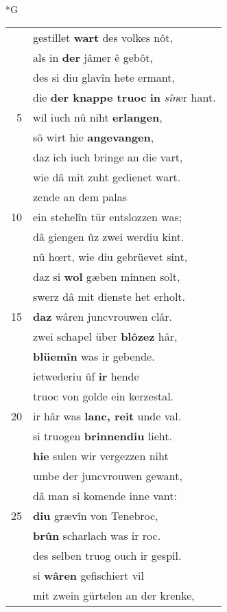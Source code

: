 \documentclass[8pt,a4paper,notitlepage]{article}
\begin{document}
\newpage
\begin{table}[ht]
\begin{minipage}[t]{0.5\linewidth}
\small
\begin{center}*G
\end{center}
\begin{tabular}{rl}
 & gestillet \textbf{wart} des volkes nôt,\\ 
 & als in \textbf{der} jâmer ê gebôt,\\ 
 & des si diu glavîn hete ermant,\\ 
 & die \textbf{der knappe truoc} \textbf{in} \textit{sîn}er hant.\\ 
5 & wil iuch nû niht \textbf{erlangen},\\ 
 & sô wirt hie \textbf{angevangen},\\ 
 & daz ich iuch bringe an die vart,\\ 
 & wie dâ mit zuht gedienet wart.\\ 
 & zende an dem palas\\ 
10 & ein stehelîn tür entslozzen was;\\ 
 & dâ giengen ûz zwei werdiu kint.\\ 
 & nû hœrt, wie diu gebrüevet sint,\\ 
 & daz si \textbf{wol} gæben minnen solt,\\ 
 & swerz dâ mit dienste het erholt.\\ 
15 & \textbf{daz} wâren juncvrouwen clâr.\\ 
 & zwei schapel über \textbf{blôzez} hâr,\\ 
 & \textbf{blüemîn} was ir gebende.\\ 
 & ietwederiu ûf \textbf{ir} hende\\ 
 & truoc von golde ein kerzestal.\\ 
20 & ir hâr was \textbf{lanc, reit} unde val.\\ 
 & si truogen \textbf{brinnendiu} lieht.\\ 
 & \textbf{hie} sulen wir vergezzen niht\\ 
 & umbe der juncvrouwen gewant,\\ 
 & dâ man si komende inne vant:\\ 
25 & \textbf{diu} grævîn von Tenebroc,\\ 
 & \textbf{brûn} scharlach was ir roc.\\ 
 & des selben truog ouch ir gespil.\\ 
 & si \textbf{wâren} gefischiert vil\\ 
 & mit zwein gürtelen an der krenke,\\ 

\end{tabular}
\end{minipage}
\end{table}
\end{document}

